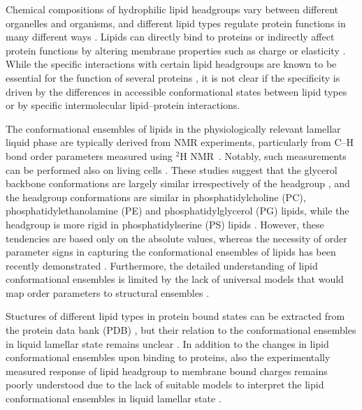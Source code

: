 \documentclass[aps,prl,superscriptaddress,twocolumn]{revtex4}
\begin{document}
Chemical compositions of hydrophilic lipid headgroups vary between different
organelles and organisms, and different lipid types
regulate protein functions in many different ways \cite{lee03,vanmeer08}.
Lipids can directly bind to proteins or indirectly affect protein
functions by altering membrane properties such as charge or elasticity \cite{lee03,lemmon08}.
While the specific interactions with certain lipid headgroups
are known to be essential for the function of several proteins \cite{lee11,lemmon08},
it is not clear if the specificity is driven by the differences in accessible
conformational states between lipid types or
by specific intermolecular lipid--protein interactions.

The conformational ensembles of lipids in the physiologically relevant lamellar liquid phase
are typically derived from NMR experiments, particularly from 
C--H bond order parameters measured using $^2$H NMR~\cite{seelig77c,davis83,Semchyschyn04}. Notably, such measurements can be performed also on living cells \cite{gally81,scherer87,seelig90}.
These studies suggest that the glycerol backbone conformations are largely similar irrespectively of the headgroup \cite{gally81}, 
and the headgroup conformations are similar in  phosphatidylcholine (PC), phosphatidylethanolamine (PE) and phosphatidylglycerol (PG) lipids, while the headgroup is more rigid in phosphatidylserine (PS) lipids \cite{wohlgemuth80,buldt81}. 
However, these tendencies are based only on the absolute values, whereas
the necessity of order parameter signs in capturing the conformational ensembles of lipids has been recently demonstrated \cite{botan15,ollila16,ferreira16}.
Furthermore, the detailed understanding of lipid conformational ensembles
is limited by the lack of universal models that would map order parameters to structural ensembles \cite{pezeshkian18,akutsu20}.

Stuctures of different lipid types in protein bound states can be extracted from the protein data bank (PDB) \cite{berman00},
but their relation to the conformational ensembles in liquid lamellar state remains unclear \cite{marsh13b}.
In addition to the changes in lipid conformational ensembles upon binding to proteins,
also the experimentally measured response of lipid headgroup to membrane bound charges remains poorly understood 
due to the lack of suitable models to interpret the lipid conformational ensembles in liquid lamellar state \cite{Semchyschyn04}.
\end{document}
